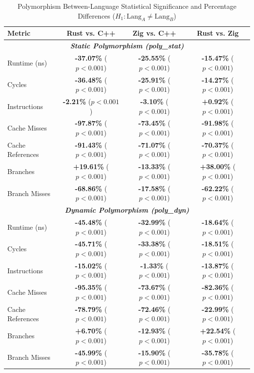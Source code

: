 \begin{table}[htbp]
\centering
\caption{Polymorphism Between-Language Statistical Significance and Percentage Differences ($H_1: \text{Lang}_A \neq \text{Lang}_B$)}
\label{tab:poly_between_lang}
\begin{tabular}{l ccc}
\toprule
\textbf{Metric} & \textbf{Rust vs. C++} & \textbf{Zig vs. C++} & \textbf{Rust vs. Zig} \\
\midrule
\multicolumn{4}{c}{\textbf{\textit{Static Polymorphism (poly\_stat)}}} \\
\midrule
Runtime (ns)       & \textbf{-37.07\%} ($p < 0.001$) & \textbf{-25.55\%} ($p < 0.001$) & \textbf{-15.47\%} ($p < 0.001$) \\
Cycles             & \textbf{-36.48\%} ($p < 0.001$) & \textbf{-25.91\%} ($p < 0.001$) & \textbf{-14.27\%} ($p < 0.001$) \\
Instructions       & \textbf{-2.21\%} ($p < 0.001$) & \textbf{-3.10\%} ($p < 0.001$) & \textbf{+0.92\%} ($p < 0.001$) \\
Cache Misses       & \textbf{-97.87\%} ($p < 0.001$) & \textbf{-73.45\%} ($p < 0.001$) & \textbf{-91.98\%} ($p < 0.001$) \\
Cache References   & \textbf{-91.43\%} ($p < 0.001$) & \textbf{-71.07\%} ($p < 0.001$) & \textbf{-70.37\%} ($p < 0.001$) \\
Branches           & \textbf{+19.61\%} ($p < 0.001$) & \textbf{-13.33\%} ($p < 0.001$) & \textbf{+38.00\%} ($p < 0.001$) \\
Branch Misses      & \textbf{-68.86\%} ($p < 0.001$) & \textbf{-17.58\%} ($p < 0.001$) & \textbf{-62.22\%} ($p < 0.001$) \\
\midrule
\multicolumn{4}{c}{\textbf{\textit{Dynamic Polymorphism (poly\_dyn)}}} \\
\midrule
Runtime (ns)       & \textbf{-45.48\%} ($p < 0.001$) & \textbf{-32.99\%} ($p < 0.001$) & \textbf{-18.64\%} ($p < 0.001$) \\
Cycles             & \textbf{-45.71\%} ($p < 0.001$) & \textbf{-33.38\%} ($p < 0.001$) & \textbf{-18.51\%} ($p < 0.001$) \\
Instructions       & \textbf{-15.02\%} ($p < 0.001$) & \textbf{-1.33\%} ($p < 0.001$) & \textbf{-13.87\%} ($p < 0.001$) \\
Cache Misses       & \textbf{-95.35\%} ($p < 0.001$) & \textbf{-73.67\%} ($p < 0.001$) & \textbf{-82.36\%} ($p < 0.001$) \\
Cache References   & \textbf{-78.79\%} ($p < 0.001$) & \textbf{-72.46\%} ($p < 0.001$) & \textbf{-22.99\%} ($p < 0.001$) \\
Branches           & \textbf{+6.70\%} ($p < 0.001$) & \textbf{-12.93\%} ($p < 0.001$) & \textbf{+22.54\%} ($p < 0.001$) \\
Branch Misses      & \textbf{-45.99\%} ($p < 0.001$) & \textbf{-15.90\%} ($p < 0.001$) & \textbf{-35.78\%} ($p < 0.001$) \\
\bottomrule
\end{tabular}
\end{table}


